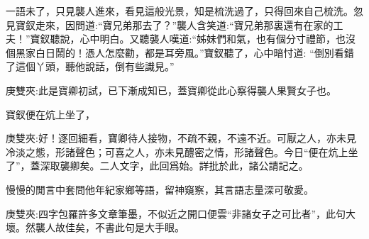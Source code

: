 \begin{parag}
    一語未了，只見襲人進來，看見這般光景，知是梳洗過了，只得回來自己梳洗。忽見寶釵走來，因問道:“寶兄弟那去了？”襲人含笑道:“寶兄弟那裏還有在家的工夫！”寶釵聽說，心中明白。又聽襲人嘆道:“姊妹們和氣，也有個分寸禮節，也沒個黑家白日鬧的！憑人怎麼勸，都是耳旁風。”寶釵聽了，心中暗忖道: “倒別看錯了這個丫頭，聽他說話，倒有些識見。”\begin{note}庚雙夾:此是寶卿初試，已下漸成知已，蓋寶卿從此心察得襲人果賢女子也。\end{note}寶釵便在炕上坐了，\begin{note}庚雙夾:好！逐回細看，寶卿待人接物，不疏不親，不遠不近。可厭之人，亦未見冷淡之態，形諸聲色；可喜之人，亦未見醴密之情，形諸聲色。今日“便在炕上坐了”，蓋深取襲卿矣。二人文字，此回爲始。詳批於此，諸公請記之。\end{note}慢慢的閒言中套問他年紀家鄉等語，留神窺察，其言語志量深可敬愛。\begin{note}庚雙夾:四字包羅許多文章筆墨，不似近之開口便雲“非諸女子之可比者”，此句大壞。然襲人故佳矣，不書此句是大手眼。\end{note}
\end{parag}


